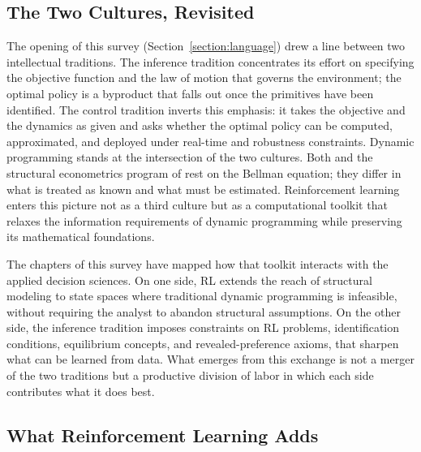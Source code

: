 
\subsection{The Two Cultures, Revisited}

The opening of this survey (Section~\ref{section:language}) drew a line between two intellectual traditions.
The inference tradition concentrates its effort on specifying the objective function and the law of motion that governs the environment; the optimal policy is a byproduct that falls out once the primitives have been identified.
The control tradition inverts this emphasis: it takes the objective and the dynamics as given and asks whether the optimal policy can be computed, approximated, and deployed under real-time and robustness constraints.
Dynamic programming stands at the intersection of the two cultures.
Both \citet{Bellman1957} and the structural econometrics program of \citet{Rust1987} rest on the Bellman equation; they differ in what is treated as known and what must be estimated.
Reinforcement learning enters this picture not as a third culture but as a computational toolkit that relaxes the information requirements of dynamic programming while preserving its mathematical foundations.

The chapters of this survey have mapped how that toolkit interacts with the applied decision sciences.
On one side, RL extends the reach of structural modeling to state spaces where traditional dynamic programming is infeasible, without requiring the analyst to abandon structural assumptions.
On the other side, the inference tradition imposes constraints on RL problems, identification conditions, equilibrium concepts, and revealed-preference axioms, that sharpen what can be learned from data.
What emerges from this exchange is not a merger of the two traditions but a productive division of labor in which each side contributes what it does best.

\subsection{What Reinforcement Learning Adds}

